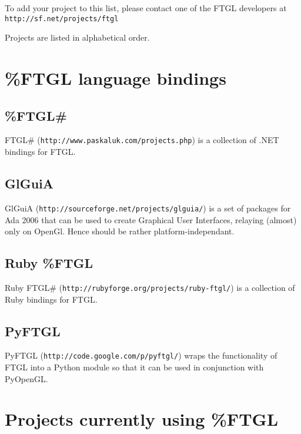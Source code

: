 To add your project to this list, please contact one of the FTGL developers at {\tt http://sf.net/projects/ftgl}

Projects are listed in alphabetical order.\section{\%FTGL language bindings}\label{ftgl-projects_bindings}
\subsection{\%FTGL\#}\label{ftgl-projects_ftglsharp}
FTGL\# ({\tt http://www.paskaluk.com/projects.php}) is a collection of .NET bindings for FTGL.\subsection{GlGuiA}\label{ftgl-projects_glguia}
GlGuiA ({\tt http://sourceforge.net/projects/glguia/}) is a set of packages for Ada 2006 that can be used to create Graphical User Interfaces, relaying (almost) only on OpenGl. Hence should be rather platform-independant.\subsection{Ruby \%FTGL}\label{ftgl-projects_ruby-ftgl}
Ruby FTGL\# ({\tt http://rubyforge.org/projects/ruby-ftgl/}) is a collection of Ruby bindings for FTGL.\subsection{PyFTGL}\label{ftgl-projects_pyftgl}
PyFTGL ({\tt http://code.google.com/p/pyftgl/}) wraps the functionality of FTGL into a Python module so that it can be used in conjunction with PyOpenGL.\section{Projects currently using \%FTGL}\label{ftgl-projects_current}
